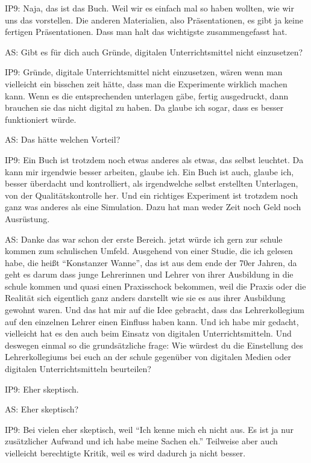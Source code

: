 \documentclass[fontsize=11pt,paper=a4]{scrbook}
\begin{document}
{\begin{itemize*}
\item[IP9:] Naja, das ist das Buch. Weil wir es einfach mal so haben wollten, wie wir uns das vorstellen. Die anderen Materialien, also Präsentationen, es gibt ja keine fertigen Präsentationen. Dass man halt das wichtigste zusammengefasst hat.
\item[AS:] Gibt es für dich auch Gründe, 
digitalen Unterrichtsmittel nicht
einzusetzen?
\item[IP9:] Gründe, digitale Unterrichtsmittel nicht einzusetzen, wären wenn man vielleicht
ein bisschen zeit hätte, dass man die Experimente
wirklich machen kann. Wenn es die entsprechenden unterlagen gäbe, fertig ausgedruckt, dann brauchen sie das nicht digital zu haben. Da glaube ich sogar, dass es besser
funktioniert würde.
\item[AS:] Das hätte welchen Vorteil?
\item[IP9:] Ein Buch ist trotzdem noch etwas anderes als etwas, das selbst leuchtet. Da kann mir irgendwie besser arbeiten, glaube ich. Ein Buch ist auch, glaube ich, besser überdacht und kontrolliert, als irgendwelche selbst erstellten Unterlagen, von der Qualitätskontrolle her. Und ein richtiges Experiment ist trotzdem noch ganz was 
anderes als eine Simulation. Dazu hat man weder Zeit noch Geld noch Ausrüstung.
\item[AS:] Danke das war schon der erste
Bereich. jetzt würde ich gern zur schule
kommen zum schulischen Umfeld.
Ausgehend von einer Studie, die ich
gelesen habe, die heißt "`Konstanzer Wanne"', 
das ist aus dem ende der 70er Jahren, 
da geht es darum dass junge Lehrerinnen
und Lehrer von ihrer Ausbildung in die
schule kommen und quasi einen
Praxisschock bekommen, weil die 
Praxis oder die Realität sich eigentlich
ganz anders darstellt wie sie es
aus ihrer Ausbildung gewohnt waren. Und das hat mir auf die Idee gebracht, 
dass das Lehrerkollegium auf den
einzelnen Lehrer einen Einfluss haben
kann. Und ich habe mir gedacht, vielleicht hat es den auch beim Einsatz von digitalen Unterrichtsmitteln. Und deswegen einmal so die grundsätzliche frage: Wie
würdest du die Einstellung des Lehrerkollegiums bei euch an der schule
gegenüber von digitalen Medien oder digitalen Unterrichtsmitteln beurteilen? 
\item[IP9:] Eher skeptisch.
\item[AS:] Eher skeptisch?
\item[IP9:] Bei vielen eher skeptisch, weil "`Ich kenne mich eh nicht aus. Es ist ja nur zusätzlicher Aufwand und ich habe meine Sachen eh."' Teilweise aber auch vielleicht berechtigte Kritik, weil es wird dadurch ja nicht besser.

\end{itemize*}}
\end{document}
